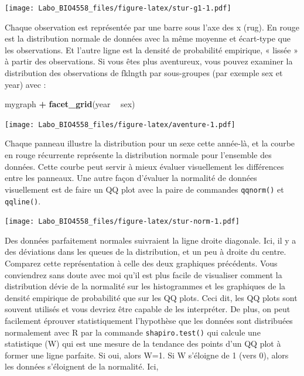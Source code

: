 \documentclass[12pt,]{book}
\newenvironment{Shaded}{\begin{snugshade}}{\end{snugshade}}
\newcommand{\KeywordTok}[1]{\textcolor[rgb]{0.13,0.29,0.53}{\textbf{#1}}}
\newcommand{\NormalTok}[1]{#1}
\newcommand{\OperatorTok}[1]{\textcolor[rgb]{0.81,0.36,0.00}{\textbf{#1}}}
\newcommand{\StringTok}[1]{\textcolor[rgb]{0.31,0.60,0.02}{#1}}
\begin{document}
\texttt{[image: Labo\_BIO4558\_files/figure-latex/stur-g1-1.pdf]}

Chaque observation est représentée par une barre sous l'axe des x (rug).
En rouge est la distribution normale de données avec la même moyenne et écart-type que les observations.
Et l'autre ligne est la densité de probabilité empirique, « lissée » à partir des observations.
Si vous êtes plus aventureux, vous pouvez examiner la distribution des observations de fklngth par sous-groupes (par exemple sex et year) avec :

\begin{Shaded}
\begin{Highlighting}[]
\NormalTok{mygraph }\OperatorTok{+}\StringTok{ }\KeywordTok{facet_grid}\NormalTok{(year }\OperatorTok{~}\StringTok{ }\NormalTok{sex)}
\end{Highlighting}
\end{Shaded}

\texttt{[image: Labo\_BIO4558\_files/figure-latex/aventure-1.pdf]}

Chaque panneau illustre la distribution pour un sexe cette année-là, et la courbe en rouge récurrente représente la distribution normale pour l'ensemble des données.
Cette courbe peut servir à mieux évaluer visuellement les différences entre les panneaux.
Une autre façon d'évaluer la normalité de données visuellement est de faire un QQ plot avec la paire de commandes \texttt{qqnorm()} et \texttt{qqline()}.

\begin{Shaded}
\end{Shaded}

\texttt{[image: Labo\_BIO4558\_files/figure-latex/stur-norm-1.pdf]}

Des données parfaitement normales suivraient la ligne droite diagonale.
Ici, il y a des déviations dans les queues de la distribution, et un peu à droite du centre.
Comparez cette représentation à celle des deux graphiques précédents.
Vous conviendrez sans doute avec moi qu'il est plus facile de visualiser comment la distribution dévie de la normalité sur les histogrammes et les graphiques de la densité empirique de probabilité que sur les QQ plots.
Ceci dit, les QQ plots sont souvent utilisés et vous devriez être capable de les interpréter.
De plus, on peut facilement éprouver statistiquement l'hypothèse que les données sont distribuées normalement avec R par la commande \texttt{shapiro.test()} qui calcule une statistique (W) qui est une mesure de la tendance des points d'un QQ plot à former une ligne parfaite.
Si oui, alors W=1.
Si W s'éloigne de 1 (vers 0), alors les données s'éloignent de la normalité.
Ici,
\end{document}
